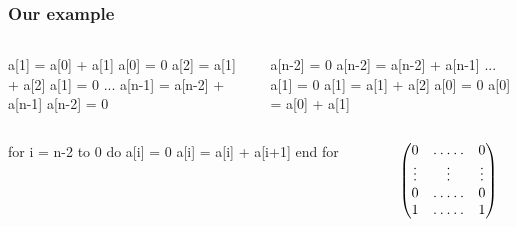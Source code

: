 \documentclass[10pt]{beamer}
\begin{document}
\begin{frame}[fragile]
  \frametitle{Our example}

  \begin{columns}
    \begin{column}{0.5\textwidth}
      \begin{center}
        \begin{minipage}{0.7\textwidth}
\begin{semiverbatim}
  a[1] = a[0] + a[1]
  a[0] = 0
  a[2] = a[1] + a[2]
  a[1] = 0
  ...
  a[n-1] = a[n-2] + a[n-1]
  a[n-2] = 0
\end{semiverbatim}
        \end{minipage}
      \end{center}
    \end{column}

    \begin{column}{0.5\textwidth}
      \begin{center}
        \begin{minipage}{0.7\textwidth}
\begin{semiverbatim}
  a[n-2] = 0
  a[n-2] = a[n-2] + a[n-1]
  ...
  a[1] = 0
  a[1] = a[1] + a[2]
  a[0] = 0
  a[0] = a[0] + a[1]
\end{semiverbatim}
        \end{minipage}
      \end{center}
    \end{column}
    \end{columns}
  
  \vfill
  \pause

  \begin{columns}

    \begin{column}{0.5\textwidth}
      \begin{center}
        \begin{minipage}{0.7\textwidth}
\begin{semiverbatim}
  for i = n-2 to 0 do
    a[i] = 0
    a[i] = a[i] + a[i+1]
  end for
\end{semiverbatim}
        \end{minipage}
      \end{center}
    \end{column}

    \begin{column}{0.5\textwidth}

      \begin{equation*}
        \begin{pmatrix}
          0 & \hdotsfor{3} & 0\\
          \vdots  &  &\vdots&& \vdots \\
          0 & \hdotsfor{3} & 0\\
          1 & \hdotsfor{3} & 1
        \end{pmatrix}
      \end{equation*}

    \end{column}
  \end{columns}
\end{frame}
\end{document}
